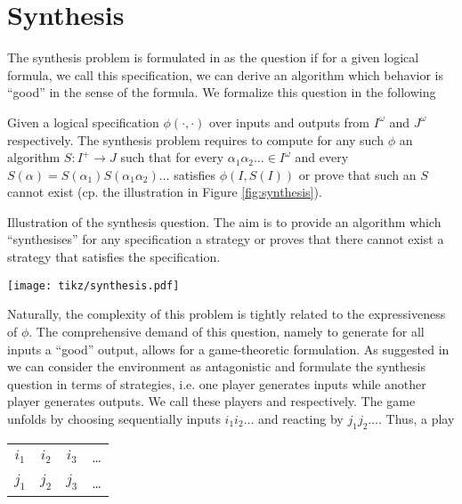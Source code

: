 \chapter{Synthesis}
\label{chapter:synthesis}
The synthesis problem is formulated in \cite{Church} as the question if for a 
given logical formula, we call this specification, we can derive an algorithm
which behavior is \enquote{good} in the sense of the formula. We formalize this
question in the following
\begin{definition}
  Given a logical specification  $\phi(\cdot, \cdot)$ over inputs and 
  outputs from $I^{\omega}$ and $J^{\omega}$ respectively. The synthesis 
  problem requires to compute for any such $\phi$ an algorithm 
  $S:I^{+}\rightarrow J$ such that for every 
  $\alpha_{1}\alpha_{2}\dots\in I^{\omega}$ and every 
  $S(\alpha) = S(\alpha_{1})S(\alpha_{1}\alpha_{2})\dots$ satisfies 
  $\phi(I, S(I))$ or prove that such an $S$ cannot exist (cp. the 
  illustration in Figure \ref{fig:synthesis}).
\end{definition}
\begin{drawing}
  \caption{Illustration of the synthesis question. The aim is to provide an 
  algorithm which \enquote{synthesises} for any specification a strategy or 
  proves that there cannot exist a strategy that satisfies the specification.}
  \label{fig:synthesis}
  \begin{center}
    \texttt{[image: tikz/synthesis.pdf]}
  \end{center}
\end{drawing}
Naturally, the complexity of this problem is tightly related to the 
expressiveness of $\phi$. The comprehensive demand of this question, namely
to generate for all inputs a \enquote{good} output, allows for a
game-theoretic formulation. As suggested in \cite{SeqCondStrat} we can consider
the environment as antagonistic and formulate the synthesis question in terms
of strategies, i.e. one player generates inputs while another player generates
outputs. We call these players  and \outputp{} respectively. The game
unfolds by  choosing sequentially inputs $i_{1}i_{2}\dots$ and 
\outputp{} reacting by $j_{1}j_{2}\dots$. Thus, a play
\begin{center}
  \begin{tabular}{cccc}
    $i_{1}$ & $i_{2}$ & $i_{3}$ & \dots\\
    $j_{1}$ & $j_{2}$ & $j_{3}$ & \dots
  \end{tabular}
\end{center}

